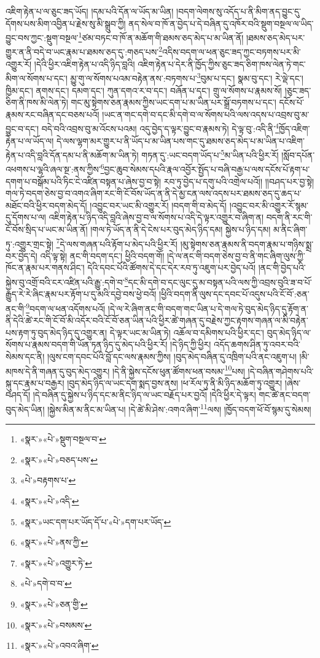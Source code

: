 འཇིག་རྟེན་པ་ལ་ཅུང་ཟད་ཡོད། །དམ་པའི་དོན་ལ་ཡོད་མ་ཡིན། །བདག་ལེགས་སུ་འདོད་པ་ནི་མིག་ནད་བྱུང་དུ་དོགས་པས་མིག་འབྱིན་པ་རྗེས་སུ་མི་སྒྲུབ་ཀྱི། ནད་སེལ་བ་ཁོ་ན་བྱེད་པ་དེ་བཞིན་དུ་འཁོར་བའི་སྡུག་བསྔལ་ལ་ཡིད་བྱུང་བས་ཀྱང་:སྡུག་བསྔལ་\footnote{«སྣར་»«པེ་»སྡུག་བསྔལ་བ་}ཙམ་བཏང་བ་ཁོ་ན་མཆོག་གི་ཐམས་ཅད་མེད་པ་མ་ཡིན་ནོ། །ཐམས་ཅད་མེད་པར་གྱུར་ན་ནི་བདེ་བ་ཡང་རྣམ་པ་ཐམས་ཅད་དུ་:གཅད་པས་\footnote{«སྣར་»«པེ་»བཅད་པས་}འདིས་བདག་ལ་ཕན་ཅུང་ཟད་ཀྱང་བཏགས་པར་མི་འགྱུར་རོ། །དེའི་ཕྱིར་འཇིག་རྟེན་པ་འདི་ཉིད་བླའི། འཇིག་རྟེན་པ་དེར་ནི་ཁྱོད་ཀྱིས་ཅུང་ཟད་ཅིག་ཁས་ལེན་ཏེ་གང་མིག་ལ་སོགས་པ་དང་། མྱུ་གུ་ལ་སོགས་པའམ་བརྟེན་ནས་:བཏགས་པ་\footnote{«པེ་»བརྟགས་པ་}བུམ་པ་དང་། སྣམ་བུ་དང་། རེ་ལྡེ་དང་། ཁྱིམ་དང་། ནགས་དང་། དམག་དང་། ཀུན་དགའ་ར་བ་དང་། བཞོན་པ་དང་། གྲུ་ལ་སོགས་པ་རྣམས་སོ། །ཅུང་ཟད་ཅིག་ནི་ཁས་མི་ལེན་ཏེ། གང་མུ་སྟེགས་ཅན་རྣམས་ཀྱིས་ཡང་དག་པ་མ་ཡིན་པར་སྒྲོ་བཏགས་པ་དང་། དངོས་པོ་རྣམས་རང་བཞིན་དང་བཅས་པའོ། །ཡང་ན་གང་དགེ་བ་དང་མི་དགེ་བ་ལ་སོགས་པའི་ལས་འདས་པ་འབྲས་བུ་མ་བྱུང་བ་དང་། བདེ་བའི་འབྲས་བུ་མ་འོངས་པའམ། འདུ་བྱེད་ད་ལྟར་བྱུང་བ་རྣམས་ཏེ། དེ་ལྟ་བུ་:འདི་ནི་\footnote{«སྣར་»«པེ་»འདི་}ཁྱོད་འཇིག་རྟེན་པ་ལ་ཡོད་ལ། དེ་ལས་ལྷག་མར་གྱུར་པ་ནི་ཡོད་པ་མ་ཡིན་པས་གང་དུ་ཐམས་ཅད་མེད་པ་མ་ཡིན་པ་འཇིག་རྟེན་པ་འདི་བླའི་དོན་དམ་པ་ནི་མཆོག་མ་ཡིན་ཏེ། གཏན་དུ་:ཡང་བདག་ཡོད་པ་\footnote{«སྣར་»ཡང་དག་པར་ཡོད་ོད་པ་«པེ་»དག་པར་ཡོད་}མ་ཡིན་པའི་ཕྱིར་རོ། །སློབ་དཔོན་འཕགས་པ་ལྷའི་ཞལ་སྔ་:ནས་ཀྱིས་\footnote{«སྣར་»«པེ་»ནས་ཀྱི་}བྱང་ཆུབ་སེམས་དཔའི་རྣལ་འབྱོར་སྤྱོད་པ་བཞི་བརྒྱ་པ་ལས་དངོས་པོ་རྟག་པ་དགག་པ་བསྒོམ་པའི་ཏིང་ངེ་འཛིན་བསྟན་པ་ཞེས་བྱ་བ་སྟེ། རབ་ཏུ་བྱེད་པ་དགུ་པའི་འགྲེལ་པའོ།། །།བཤད་པར་བྱ་སྟེ། གལ་ཏེ་བདག་ཅེས་བྱ་བ་འགའ་ཞིག་རང་གི་ངོ་བོས་ཡོད་ན་ནི་དེ་མྱ་ངན་ལས་འདས་པར་ཐམས་ཅད་དུ་ཆད་པ་མཐོང་བའི་ཕྱིར་བདག་མེད་དོ། །འབྱུང་བར་ཡང་མི་འགྱུར་རོ། །བདག་གི་བ་མེད་དོ། །འབྱུང་བར་མི་འགྱུར་རོ་སྙམ་དུ་དོགས་པ་ལ། འཇིག་རྟེན་པ་ཉིད་འདི་བླའི་ཞེས་བྱ་བ་ལ་སོགས་པ་འདི་དེ་ལྟར་འགྱུར་བ་ཞིག་ན། བདག་ནི་རང་གི་ངོ་བོས་སྲིད་པ་ཡང་མ་ཡིན་ནོ། །གལ་ཏེ་ཡོད་ན་ནི་དེ་ངེས་པར་བུད་མེད་ཉིད་དམ། སྐྱེས་པ་ཉིད་དམ། མ་ནིང་ཞིག་ཏུ་:འགྱུར་གྲང་སྟེ། \footnote{«སྣར་»«པེ་»འགྱུར་ཏེ་}དེ་ལས་གཞན་པའི་རྟོག་པ་མེད་པའི་ཕྱིར་རོ། །མུ་སྟེགས་ཅན་རྣམས་ནི་བདག་རྣམ་པ་གཉིས་སྨྲ་བར་བྱེད་དེ། འདི་ལྟ་སྟེ། ནང་གི་བདག་དང་། ཕྱིའི་བདག་གོ། །དེ་ལ་ནང་གི་བདག་ཅེས་བྱ་བ་ནི་གང་ཞིག་ལུས་ཀྱི་ཁོང་ན་རྣམ་པར་གནས་ཤིང་། དེའི་དབང་པོའི་ཚོགས་དེ་དང་དེར་རབ་ཏུ་འཇུག་པར་བྱེད་པའོ། །ནང་གི་བྱེད་པའི་སྐྱེས་བུ་འགྲོ་བའི་ངར་འཛིན་པའི་རྒྱུ་:དགེ་བ་\footnote{«པེ་»དགེ་བ་བ་}དང་མི་དགེ་བ་དང་ལུང་དུ་མ་བསྟན་པའི་ལས་ཀྱི་འབྲས་བུའི་ཟ་བ་པོ་རྒྱུད་རེ་རེ་ཞིང་རྣམ་པར་རྟོག་པ་དུ་མའི་དབྱེ་བས་ཕྱེ་བའོ། །ཕྱིའི་བདག་ནི་ལུས་དང་དབང་པོ་འདུས་པའི་ངོ་བོ་:ཅན་ནང་གི་\footnote{«སྣར་»«པེ་»ཅན་གྱི་}བདག་ལ་ཕན་འདོགས་པའོ། །དེ་ལ་རེ་ཞིག་ནང་གི་བདག་གང་ཡིན་པ་དེ་གལ་ཏེ་བུད་མེད་ཉིད་དུ་རྟོག་ན་ནི་དེའི་ཚེ་རང་གི་ངོ་བོ་མི་འདོར་བའི་ངོ་བོ་ཅན་ཡིན་པའི་ཕྱིར་ཚེ་གཞན་དུ་བརྗེས་ཀྱང་རྟགས་གཞན་ལ་མི་བརྟེན་པས་རྟག་ཏུ་བུད་མེད་ཉིད་དུ་འགྱུར་ན། དེ་ལྟར་ཡང་མ་ཡིན་ཏེ། འཆོལ་བ་དམིགས་པའི་ཕྱིར་དང་། བུད་མེད་ཉིད་ལ་སོགས་པ་རྣམས་བདག་གི་ཡོན་ཏན་ཉིད་དུ་མེད་པའི་ཕྱིར་རོ། །དེ་ཉིད་ཀྱི་ཕྱིར། འདོད་ཆགས་ཤིན་ཏུ་འབར་བའི་སེམས་དང་ནི། །ལུས་ངག་དབང་པོའི་བློ་དང་ལས་རྣམས་ཀྱིས། །བུད་མེད་བཞིན་དུ་འཁྲིག་པའི་ནང་འཇུག་པ། །མི་མཁས་དེ་ནི་གཞན་དུ་བུད་མེད་འགྱུར། །དེ་ནི་སྐྱེས་དངོས་ཕུན་ཚོགས་ཕན་བསམ་\footnote{«སྣར་»«པེ་»བསམས་}པས། །དེ་བཞིན་གཤེགས་པའི་སྐུ་དང་རྣམ་པ་བརྒྱར། །བུད་མེད་ཉིད་ལ་ཡང་དག་སྨད་བྱས་ནས། །ཕ་རོལ་ཏུ་ནི་མི་ཉིད་མཆོག་ཏུ་འགྱུར། །ཞེས་བཤད་དོ། །དེ་བཞིན་དུ་སྐྱེས་པ་ཉིད་དང་མ་ནིང་ཉིད་ལ་ཡང་བརྗོད་པར་བྱའོ། །དེའི་ཕྱིར་དེ་ལྟར། གང་ཚེ་ནང་བདག་བུད་མེད་ཡིན། །སྐྱེས་མིན་མ་ནིང་མ་ཡིན་པ། །དེ་ཚེ་མི་ཤེས་:འགའ་ཞིག་\footnote{«སྣར་»«པེ་»འབའ་ཞིག་}ལས། །ཁྱོད་བདག་ཕོ་བོ་སྙམ་དུ་སེམས། 